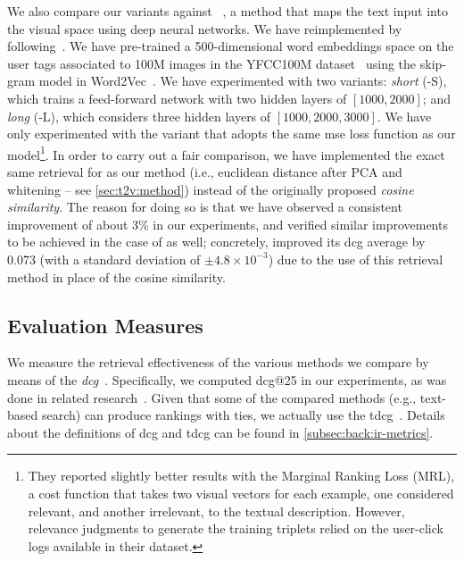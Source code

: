 We also compare our \ttv{} variants against \wordvisual{}~\cite{dong2018predicting}, a method that maps the text input into the visual space using deep neural networks.
We have reimplemented \wordvisual{} by following~\cite{dong2018predicting}.
We have pre-trained a 500-dimensional word embeddings space on the user tags associated to 100M images in the YFCC100M dataset~\cite{thomee2016yfcc100m} using the skip-gram model in Word2Vec~\cite{mikolov2013distributed}.
We have experimented with two variants: \emph{short} (\wordvisual{}-S), which trains a feed-forward network with two hidden layers of $[1000, 2000]$; and \emph{long} (\wordvisual{}-L), which considers three hidden layers of $[1000, 2000, 3000]$.
We have only experimented with the variant that adopts the same \gls{mse} loss function as our model\footnote{They reported slightly better results with the Marginal Ranking Loss (MRL), a cost function that takes two visual vectors for each example, one considered relevant, and another irrelevant, to the textual description. However, relevance judgments to generate the training triplets relied on the user-click logs available in their dataset.}. %
In order to carry out a fair comparison, we have implemented the exact same retrieval for \wordvisual{} as our method (i.e.,  euclidean distance after PCA and whitening -- see \ref{sec:t2v:method}) instead of the originally proposed \emph{cosine similarity}.
The reason for doing so is that we have observed a consistent improvement of about 3\% in our experiments, and verified similar improvements to be achieved in the case of \wordvisual{} as well;
concretely, \wordvisual{} improved its \gls{dcg} average by 0.073 (with a standard deviation of $\pm 4.8 \times 10^{-3}$) due to the use of this retrieval method in place of the cosine similarity.

\subsection{Evaluation Measures}
\label{subsec:t2v:eval}

We measure the retrieval effectiveness of the various methods we compare by means of the \emph{\acrfull{dcg}}~\cite{jarvelin2002cumulated}.
%
%
Specifically, we computed \gls{dcg}@25 in our experiments, as was done in related research~\cite{hua2013clickage,dong2018predicting}.
Given that some of the compared methods (e.g., text-based search) can produce rankings with ties, we actually use the \gls{tdcg}~\cite{mcsherry2008computing}.
Details about the definitions of \gls{dcg} and \gls{tdcg} can be found in \ref{subsec:back:ir-metrics}.

